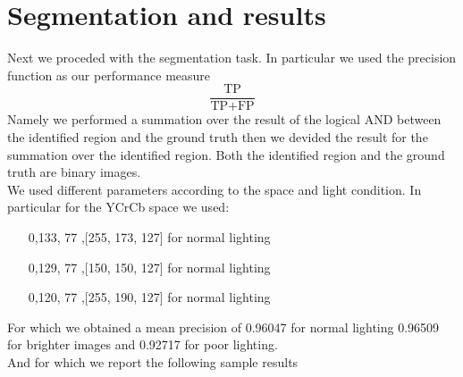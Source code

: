 \documentclass{report}
\begin{document}
\chapter{Segmentation and results}
Next we proceded with the segmentation task. In particular we used the precision function as
our performance measure 
\[
  \frac{\text{TP}}{\text{TP}+\text{FP}}
\]
Namely we performed a summation over the result of the logical AND between the identified region
and the ground truth then we devided the result for the summation over the identified region.
Both the identified region and the ground truth are binary images. \\
We used different parameters according to the space and light condition. In particular for the
YCrCb space we used:
\begin{itemize}
  \item [0,133, 77],[255, 173, 127] for normal lighting
  \item [0,129, 77],[150, 150, 127] for normal lighting
  \item [0,120, 77],[255, 190, 127] for normal lighting
\end{itemize}
For which we obtained a mean precision of 0.96047 for normal lighting 0.96509 for brighter images
and 0.92717 for poor lighting.\\
And for which we report the following sample results
\end{document}
